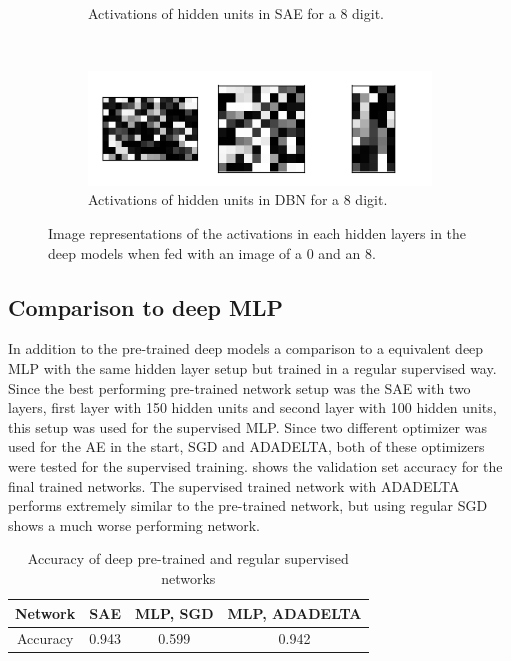 \documentclass{article}
\begin{document}
\begin{figure}[!ht]
\begin{subfigure}[t]{0.47\textwidth}
    \caption{Activations of hidden units in SAE for a 8 digit.}
    \label{fig:saeactivation8}
  \end{subfigure}
  ~
  \begin{subfigure}[t]{0.47\textwidth}
    \centering
    \includegraphics[width=\textwidth]{../plots/3_2_2/dbn_d8_activations.png}
    \caption{Activations of hidden units in DBN for a 8 digit.}
    \label{fig:dbnactivation8}
  \end{subfigure}
  \caption{
    Image representations of the activations in each hidden layers in the deep models
    when fed with an image of a 0 and an 8.
  }
  \label{fig:deepactivations}
\end{figure}

\subsection{Comparison to deep MLP}
In addition to the pre-trained deep models a comparison to a equivalent deep MLP
with the same hidden layer setup but trained in a regular supervised way.
Since the best performing pre-trained network setup was the SAE with two layers,
first layer with 150 hidden units and second layer with 100 hidden units,
this setup was used for the supervised MLP.
Since two different optimizer was used for the AE in the start,
SGD and ADADELTA,
both of these optimizers were tested for the supervised training.
 shows the validation set accuracy for the final trained networks.
The supervised trained network with ADADELTA performs extremely similar to the pre-trained network,
but using regular SGD shows a much worse performing network.

\begin{table}[!ht]
  \centering
  \caption{Accuracy of deep pre-trained and regular supervised networks}
  \label{tab:supervisedvsunsupervised}
  \begin{tabular}{c|ccc}
    Network & SAE & MLP, SGD & MLP, ADADELTA \\ \midrule
    Accuracy & 0.943 & 0.599 & 0.942
  \end{tabular}
\end{table}

{}

\end{document}
